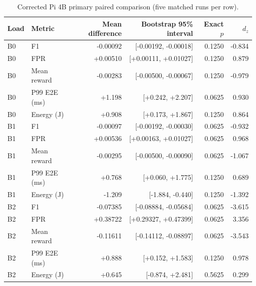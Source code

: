 \begin{table}[t]\caption{Corrected Pi 4B primary paired comparison (five matched runs per row).}\centering\footnotesize
\begin{tabular}{llrrrr}\toprule
Load & Metric & Mean difference & Bootstrap 95\% interval & Exact $p$ & $d_z$ \\\midrule
B0 & F1 & -0.00092 & [-0.00192, -0.00018] & 0.1250 & -0.834 \\
B0 & FPR & +0.00510 & [+0.00111, +0.01027] & 0.1250 & 0.879 \\
B0 & Mean reward & -0.00283 & [-0.00500, -0.00067] & 0.1250 & -0.979 \\
B0 & P99 E2E (ms) & +1.198 & [+0.242, +2.207] & 0.0625 & 0.930 \\
B0 & Energy (J) & +0.908 & [+0.173, +1.867] & 0.1250 & 0.864 \\
B1 & F1 & -0.00097 & [-0.00192, -0.00030] & 0.0625 & -0.932 \\
B1 & FPR & +0.00536 & [+0.00163, +0.01027] & 0.0625 & 0.968 \\
B1 & Mean reward & -0.00295 & [-0.00500, -0.00090] & 0.0625 & -1.067 \\
B1 & P99 E2E (ms) & +0.768 & [+0.060, +1.775] & 0.1250 & 0.689 \\
B1 & Energy (J) & -1.209 & [-1.884, -0.440] & 0.1250 & -1.392 \\
B2 & F1 & -0.07385 & [-0.08884, -0.05684] & 0.0625 & -3.615 \\
B2 & FPR & +0.38722 & [+0.29327, +0.47399] & 0.0625 & 3.356 \\
B2 & Mean reward & -0.11611 & [-0.14112, -0.08897] & 0.0625 & -3.543 \\
B2 & P99 E2E (ms) & +0.888 & [+0.152, +1.583] & 0.1250 & 0.978 \\
B2 & Energy (J) & +0.645 & [-0.874, +2.481] & 0.5625 & 0.299 \\
\bottomrule\end{tabular}\end{table}
